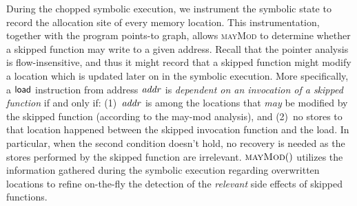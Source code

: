During the chopped symbolic execution, we instrument the symbolic
state to record the allocation site of every memory location. This
instrumentation, together with the program points-to graph, allows
\textsc{mayMod} to determine whether a skipped function may write to a
given address. Recall that the pointer analysis is flow-insensitive,
and thus it might record that a skipped function might modify a
location which is updated later on in the symbolic execution.  More
specifically, a $\mathsf{load}$ instruction from address $\mathit{addr}$ is
\emph{dependent on an invocation of a skipped function} if and only
if: (1)~$\mathit{addr}$ is among the locations that \textit{may} be modified
by the skipped function (according to the may-mod analysis), and
(2)~no stores to that location happened between the skipped invocation
function and the load. In particular, when the second condition
doesn't hold, no recovery is needed as the stores performed by the
skipped function are irrelevant. $\Call{mayMod}$ utilizes the
information gathered during the symbolic execution regarding
overwritten locations to refine on-the-fly the detection of the
\emph{relevant} side effects of skipped functions.

